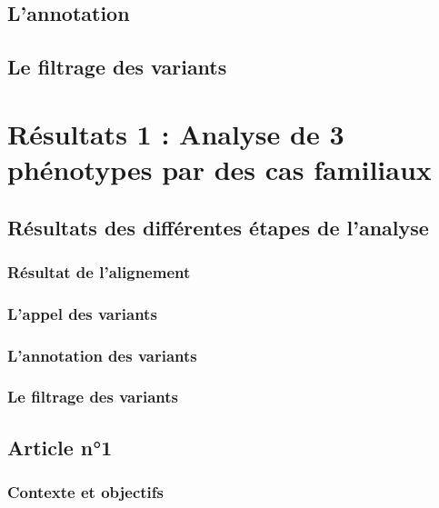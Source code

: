 \documentclass[12pt,twoside]{ugathesis}
\begin{document}
\subsection{L'annotation}\label{lannotation}

\subsection{Le filtrage des variants}\label{le-filtrage-des-variants-1}

\section{Résultats 1 : Analyse de 3 phénotypes par des cas
familiaux}\label{resultats-1-analyse-de-3-phenotypes-par-des-cas-familiaux}

\subsection{Résultats des différentes étapes de
l'analyse}\label{resultats-des-differentes-etapes-de-lanalyse}

\subsubsection{Résultat de l'alignement}\label{resultat-de-lalignement}

\subsubsection{L'appel des variants}\label{lappel-des-variants-1}

\subsubsection{L'annotation des
variants}\label{lannotation-des-variants-1}

\subsubsection{Le filtrage des
variants}\label{le-filtrage-des-variants-2}

\subsection{Article n°1}\label{article-n1}

\subsubsection{Contexte et objectifs}\label{contexte-et-objectifs}
\end{document}
